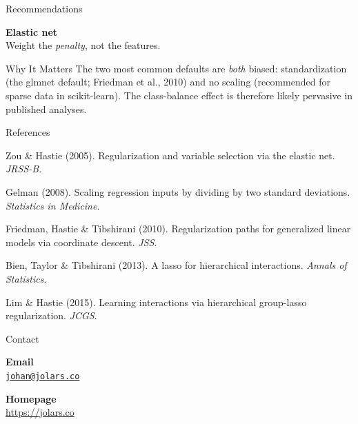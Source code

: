 \documentclass[final,20pt]{beamer}
\newcommand{\pkg}[1]{\textsf{#1}}
\begin{document}
\begin{frame}[t]
\begin{minipage}[t][\colheight][t]{\onecolwidth}
\begin{block}{Recommendations}
      \bigskip

      \textbf{Elastic net}\\
      Weight the \emph{penalty}, not the features.
    \end{block}

    \vfill

    \begin{block}{Why It Matters}
      The two most common defaults are \emph{both} biased: standardization (the
      \pkg{glmnet} default; Friedman et al., 2010) and no scaling (recommended
      for sparse data in \pkg{scikit-learn}). The class-balance effect is
      therefore likely pervasive in published analyses.
    \end{block}

    \vfill

    \begin{block}{References}
    {
      \footnotesize

      Zou \& Hastie (2005). Regularization and variable selection via
      the elastic net. \emph{JRSS-B}.

      \bigskip

      Gelman (2008). Scaling regression inputs by dividing by two
      standard deviations. \emph{Statistics in Medicine}.

      \bigskip

      Friedman, Hastie \& Tibshirani (2010). Regularization paths for
      generalized linear models via coordinate descent. \emph{JSS}.

      \bigskip

      Bien, Taylor \& Tibshirani (2013). A lasso for hierarchical
      interactions. \emph{Annals of Statistics}.

      \bigskip

      Lim \& Hastie (2015). Learning interactions via hierarchical
      group-lasso regularization. \emph{JCGS}.

      \par
    }
    \end{block}

    \vfill

    \begin{block}{Contact}
      \begin{minipage}[b]{0.6\linewidth}
        \textbf{Email}\\
        \href{mailto:johan@jolars.co}{\nolinkurl{johan@jolars.co}}

        \bigskip

        \textbf{Homepage}\\
        \href{https://jolars.co}{\url{https://jolars.co}}


\end{minipage}
\end{block}
\end{minipage}
\end{frame}
\end{document}
